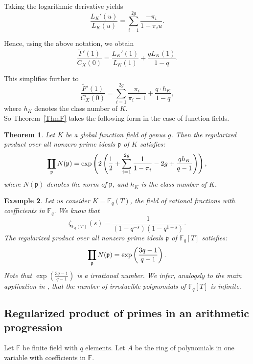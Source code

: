 \documentclass[12pt]{amsart}
\DeclareMathOperator*\Rprod{%
\mathchoice
  {\ooalign{$\displaystyle\prod$\cr\hidewidth$\displaystyle\coprod$\hidewidth\cr}}%
  {\ooalign{$\textstyle\prod$\cr\hidewidth$\textstyle\coprod$\hidewidth\cr}}%
  {\ooalign{$\scriptstyle\prod$\cr\hidewidth$\scriptstyle\coprod$\hidewidth\cr}}%
  {\ooalign{$\scriptscriptstyle\prod$\cr\hidewidth$%
  \scriptscriptstyle\coprod$\hidewidth\cr}}}
\newtheorem{theorem}{Theorem}[section]
\newtheorem{example}[theorem]{Example}
\begin{document}
Taking the logarithmic derivative yields
\[
\frac{L_K'(u)}{L_K(u)} = \sum_{i=1}^{2g} \frac{-\pi_i}{1 - \pi_i u}.
\]


Hence, using the above notation, we obtain
\[
\frac{\widetilde{F}'(1)}{C_X(0)} = \frac{L_K'(1)}{L_K(1)} + \frac{q  L_K(1)}{1 - q}.
\]


This simplifies further to
\[
\frac{\widetilde{F}'(1)}{C_X(0)} = \sum_{i=1}^{2g} \frac{\pi_i}{\pi_i - 1} + \frac{q \cdot h_K}{1 - q},
\]
where $h_K$ denotes the class number of $K$.\\

So Theorem~\ref{ThmF} takes the following form in the case of function fields.


\begin{theorem}
Let $K$ be a global function field of genus $g$. Then the regularized product over all nonzero prime ideals $\mathfrak{p}$ of $K$ satisfies:
\[
\Rprod_{\mathfrak{p}} N(\mathfrak{p}) = \exp\left( 2 \left( \frac{1}{2} + \sum_{i=1}^{2g} \frac{1}{1 - \pi_i} - 2g + \frac{q h_K}{q - 1} \right) \right),
\]
where $N(\mathfrak{p})$ denotes the norm of $\mathfrak{p}$, and $h_K$ is the class number of $K$.
\end{theorem}






\begin{example} Let us consider $K = \mathbb{F}_q(T)$, the field of rational fractions with coefficients in $\mathbb F_q$. 
We know that
\[
\zeta_{\mathbb F_q(T)}(s) = \frac{1}{(1 - q^{-s})(1 - q^{1-s})}.
\]
The regularized product over all nonzero prime ideals $\mathfrak{p}$ of $\mathbb F_q[T]$ satisfies:
\[
\Rprod_{\mathfrak{p}} N(\mathfrak{p}) = \exp\left( \frac{3q-1}{ q-1} \right).
\]
Note that $\exp\left( \frac{3q-1}{ q-1} \right)$ is a irrational number. We infer, analogsly to the main application  in \cite{Marco_prime}, that the number of irreducible polynomials of $\mathbb F_q[T]$ is infinite. \\

\end{example}

\subsection{Regularized product of primes in an arithmetic progression}\label{RFFP}

Let $\mathbb F$ be finite field with $q$ elements. Let $A$ be the ring of polynomials in one variable with coefficients in $\mathbb F$.\\
\end{document}

